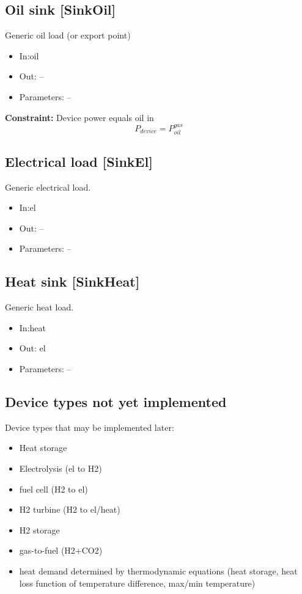 \documentclass[12pt]{article}
\begin{document}
\subsection{Oil sink [SinkOil]}

Generic oil load (or export point)

\begin{itemize}
\item In:oil
\item Out: --
\item Parameters: --
\end{itemize}


\textbf{Constraint:}
Device power equals oil in
 \[ P_{device}=P_{oil}^{gas} \] 


\subsection{Electrical load [SinkEl]}

Generic electrical load.

\begin{itemize}
\item In:el
\item Out: --
\item Parameters: --
\end{itemize}



\subsection{Heat sink [SinkHeat]}

Generic heat load.

\begin{itemize}
\item In:heat
\item Out: el
\item Parameters: --
\end{itemize}


\subsection{Device types not yet implemented}
Device types that may be implemented later:
\begin{itemize}
	\item Heat storage
	\item Electrolysis (el to H2)
	\item fuel cell (H2 to el)
	\item H2 turbine (H2 to el/heat)
	\item H2 storage
	\item gas-to-fuel (H2+CO2)
	\item heat demand determined by thermodynamic equations (heat storage, heat loss function of temperature difference, max/min temperature)
\end{itemize}
\end{document}
